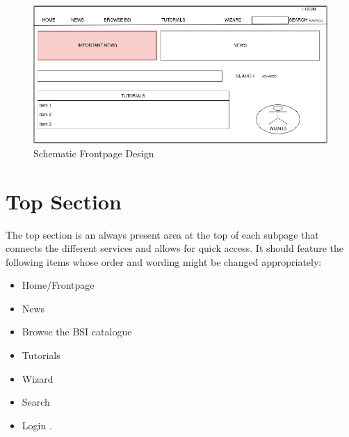 \begin{figure}[h]
    \centering
    \includegraphics[scale=0.3]{Pictures/frontpage_mockup}
    \caption{Schematic Frontpage Design}
\end{figure}
 
\section{Top Section} 
\label{top_section}

The top section is an always present area at the top of each subpage that connects the different services and allows for quick access.
It should feature the following items whose order and wording might be changed appropriately:
\begin{itemize}
    \item Home/Frontpage
    \item News
    \item Browse the BSI catalogue
    \item Tutorials
    \item Wizard
    \item Search
    \item Login 
        . 
\end{itemize}



